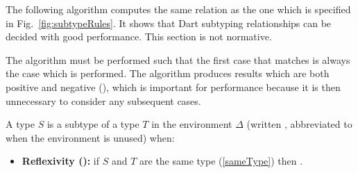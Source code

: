 \documentclass[makeidx]{article}
\begin{document}
{\LMHash{}%
The following algorithm computes the same relation as
the one which is specified in Fig.~\ref{fig:subtypeRules}.
It shows that Dart subtyping relationships can be decided
with good performance.
This section is not normative.

\LMHash{}%
The algorithm must be performed such that the first case that matches
is always the case which is performed.
The algorithm produces results which are both positive and negative
(),
which is important for performance because
it is then unnecessary to consider any subsequent cases.

\LMHash{}%
A type $S$ is a subtype of a type $T$ in the environment $\Delta$
(written ,
abbreviated to  when the environment is unused) when:

\begin{itemize}
\item
  \textbf{Reflexivity (\SrnReflexivity):}
  if $S$ and $T$ are the same type (\ref{sameType})
  then .


\end{itemize}}
\end{document}
